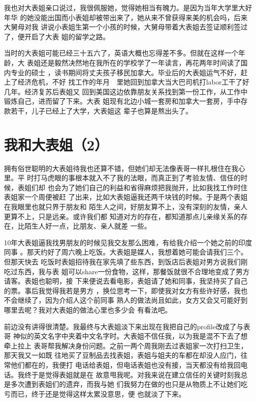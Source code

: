 \documentclass[12pt]{book}
\begin{document}
我也对大表姐亲口说过，我很佩服她，觉得她相当有魄力。是因为当年大学里大好年华
的她没能出国而小表姐却被带出来了，她从来不曾获得来美的机会吗，后来大舅母对我
讲说小表姐生第一个小孩的时候，大舅母带着大表姐去签证顺利签过了，便开启了大表
姐的留学之路。

当时的大表姐可能已经三十五六了，英语大概也忘得差不多。但就在这样一个年龄，大
表姐还是毅然决然地在我所在的学校学了一年读言，再花两年时间读了国内专业的硕士
，读书期间将丈夫孩子移民加拿大。毕业后的大表姐运气不好，赶上了经济危机，不好
找工作的年月　里她回到加拿大当大巴司机打labor工干了好几年。经济复苏后表姐又
回到美国这边依靠朋友关系找到第一份工作，从工作中锻炼自己，进而留了下来。大表
姐现有北边小城一套房和加拿大一套房，手中存款若干，儿子已经上了大学，大表姐这
辈子也算是熬出头了。
\section{我和大表姐（2）}
\label{sec-9-82}

拥有俗世聪明的大表姐待我也还算不错，但她们却无法像表哥一样扎根住在我心里。平
时打马虎眼的事根本就入不了我的法眼，而真正到了考验友情、信任的时候，表姐们却
也会为了她们自己的利益和省得麻烦把我抛开，比如我找工作时住表姐家一个周便被赶
了出来，比如大表姐逼我还两千块钱的时候。于是两个表姐在我眼里也就只界于朋友和
陌生人之间，好朋友算不上，没有深刻的友情，亲人更算不上，只是远亲。或许我们都
知道对方的存在，都知道那点儿亲缘关系的存在，比陌生人好一点，比朋友、亲人就差
一些。

10年大表姐逼我找男朋友的时候见我交友那么困难，有给我介绍一个她之前的印度同事
。那天约好了周六晚上吃饭。大表姐是媒人，我想着她可能会请我们三个。但那天快去
吃饭时表姐招待我在家先填了些东西，到饭店后表姐对男方说我们刚吃过东西，我与表
姐可以share一份食物，这样，那餐饭就很不合理地变成了男方请客。表姐也聪明，接
下来便说去看电影，表姐请了她和同事，我坚持买了自己的票。事后我觉得我若是男方
，换位思考一下，即使我对女方有些许好感，我也不会继续了，因为介绍人这个前同事
熟人的做法尚且如此，女方又会又可能好到哪里去呢？我对大表姐的做法心里也多少会
有看法吧。

前边没有讲得很清楚。我最终与大表姐淡下来出现在我把自己的profile改成了与表哥
神似的英文名字中夹着中文名字时。大表姐不信任我，以为我是混不下去了想牵上拉上
表哥帮我解决身份问题。之前一两个周我刚去过表姐家一次打扫卫生，那天我又一如既
往地买了豆制品去找表姐，表姐与姐夫的车都在却没人应门，往常他们都在的，我便打
电话给表姐，但电话表姐也没有接，当天都没有给我回电话。我终于是觉得表姐就是在
故意甩我呢。对我来说在建立信任的关键时刻我总是多次遭到表姐们的遗弃，而我与她
们我努力在做的也只是从物质上不让她们吃亏而已，终于还是觉得这样太累没意思，便
也就淡了下来。
\end{document}
